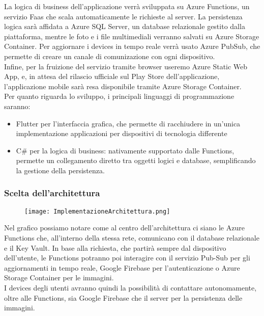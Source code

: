 La logica di business dell'applicazione verrà sviluppata su Azure Functions, un servizio Faas che scala automaticamente le richieste al server.
La persistenza logica sarà affidata a Azure SQL Server, un database relazionale gestito dalla piattaforma, mentre le foto e i file multimediali verranno salvati su Azure Storage Container.
Per aggiornare i devices in tempo reale verrà usato Azure PubSub, che permette di creare un canale di comunizazione con ogni dispositivo.\\
Infine, per la fruizione del servizio tramite browser useremo Azure Static Web App, e, in attesa del rilascio ufficiale sul Play Store dell'applicazione, 
l'applicazione mobile sarà resa disponibile tramite Azure Storage Container.\\
Per quanto riguarda lo sviluppo, i principali linguaggi di programmazione saranno:
\begin{itemize}
    \item Flutter per l'interfaccia grafica, che permette di racchiudere in un'unica implementazione applicazioni per dispositivi di tecnologia differente
    \item C\# per la logica di business: nativamente supportato dalle Functions, permette un collegamento diretto tra oggetti logici e database, semplificando la gestione della persistenza.
\end{itemize}
\pagebreak

\subsubsection{Scelta dell'architettura}
\begin{figure}[h!]
    \begin{center}
        \texttt{[image: ImplementazioneArchitettura.png]}
    \end{center}
\end{figure}
Nel grafico possiamo notare come al centro dell'architettura ci siano le Azure Functions che, all'interno della stessa rete, comunicano con il database relazionale e il Key Vault.
In base alla richiesta, che partirà sempre dal dispositivo dell'utente, le Functions potranno poi interagire con 
il servizio Pub-Sub per gli aggiornamenti in tempo reale, 
Google Firebase per l'autenticazione o 
Azure Storage Container per le immagini.\\
I devices degli utenti avranno quindi la possibilità di contattare autonomamente, oltre alle Functions, sia Google Firebase che il server per la persistenza delle immagini. 
\clearpage
